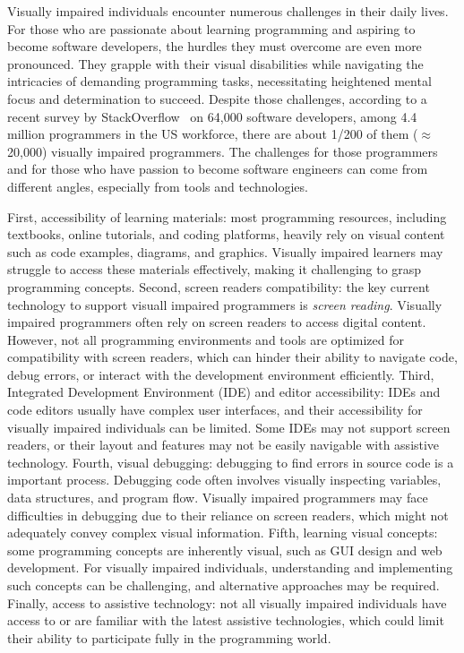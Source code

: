 


Visually impaired individuals encounter numerous challenges in their
daily lives. For those who are passionate about learning programming
and aspiring to become software developers, the hurdles they must
overcome are even more pronounced. They grapple with their visual
disabilities while navigating the intricacies of demanding programming
tasks, necessitating heightened mental focus and determination to
succeed. Despite those challenges, according to a recent survey by
StackOverflow~\cite{blind-code} on 64,000 software developers, among 4.4
million programmers in the US workforce, there are about 1/200 of them
($\approx$ 20,000) visually impaired programmers. The challenges for
those programmers and for those who have passion to become software
engineers can come from different angles, especially from tools
and technologies.

First, accessibility of learning materials: most programming
resources, including textbooks, online tutorials, and coding
platforms, heavily rely on visual content such as code examples,
diagrams, and graphics. Visually impaired learners may struggle to
access these materials effectively, making it challenging to grasp
programming concepts. Second, screen readers compatibility: the key
current technology to support visuall impaired programmers is {\em
screen reading}. Visually impaired programmers often rely on screen
readers to access digital content. However, not all programming
environments and tools are optimized for compatibility with screen
readers, which can hinder their ability to navigate code, debug
errors, or interact with the development environment efficiently.
Third, Integrated Development Environment (IDE) and editor
accessibility: IDEs and code editors usually have complex user
interfaces, and their accessibility for visually impaired individuals
can be limited. Some IDEs may not support screen readers, or their
layout and features may not be easily navigable with assistive
technology. Fourth, visual debugging: debugging to find errors in
source code is a important process. Debugging code often involves
visually inspecting variables, data structures, and program
flow. Visually impaired programmers may face difficulties in debugging
due to their reliance on screen readers, which might not adequately
convey complex visual information. Fifth, learning visual concepts:
some programming concepts are inherently visual, such as GUI design
and web development. For visually impaired individuals, understanding
and implementing such concepts can be challenging, and alternative
approaches may be required. Finally, access to assistive technology:
not all visually impaired individuals have access to or are familiar
with the latest assistive technologies, which could limit their
ability to participate fully in the programming world.

